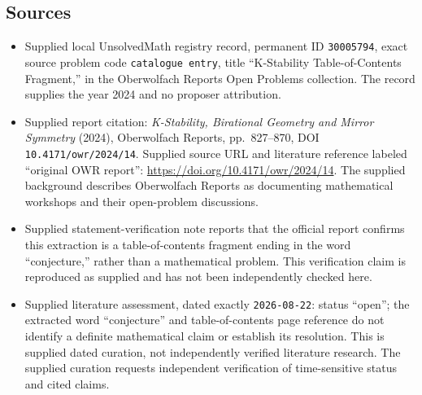 \documentclass[11pt]{article}
\begin{document}
\subsection{Sources}
\begin{itemize}
\item Supplied local UnsolvedMath registry record, permanent ID \texttt{30005794}, exact source problem code \texttt{catalogue entry}, title ``K-Stability Table-of-Contents Fragment,'' in the Oberwolfach Reports Open Problems collection. The record supplies the year 2024 and no proposer attribution.
\item Supplied report citation: \emph{K-Stability, Birational Geometry and Mirror Symmetry} (2024), Oberwolfach Reports, pp.\ 827--870, DOI \texttt{10.4171/owr/2024/14}. Supplied source URL and literature reference labeled ``original OWR report'': \url{https://doi.org/10.4171/owr/2024/14}. The supplied background describes Oberwolfach Reports as documenting mathematical workshops and their open-problem discussions.
\item Supplied statement-verification note reports that the official report confirms this extraction is a table-of-contents fragment ending in the word ``conjecture,'' rather than a mathematical problem. This verification claim is reproduced as supplied and has not been independently checked here.
\item Supplied literature assessment, dated exactly \texttt{2026-08-22}: status ``open''; the extracted word ``conjecture'' and table-of-contents page reference do not identify a definite mathematical claim or establish its resolution. This is supplied dated curation, not independently verified literature research. The supplied curation requests independent verification of time-sensitive status and cited claims.
\end{itemize}
\end{document}
